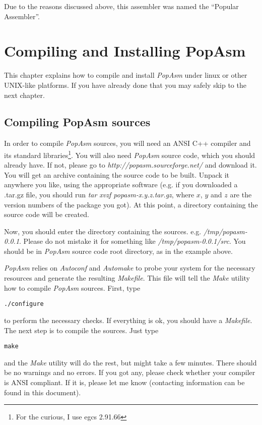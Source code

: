 \documentclass[a4paper,12pt]{book}
\begin{document}
Due to the reasons discussed above, this assembler was named the ``Popular Assembler''.

\chapter{Compiling and Installing PopAsm}
This chapter explains how to compile and install \emph{PopAsm} under linux or other UNIX-like
platforms. If you have already done that you may safely skip to the next chapter.

\section{Compiling PopAsm sources\label{COMPILING}}
In order to compile \emph{PopAsm} sources, you will need an ANSI C++ compiler and its standard
libraries\footnote{For the curious, I use egcs 2.91.66}. You will also need \emph{PopAsm} source
code, which you should already have. If not, please go to \emph{http://popasm.sourceforge.net/}
and download it. You will get an archive containing the source code to be built. Unpack it
anywhere you like, using the appropriate software (e.g. if you downloaded a .tar.gz file, you
should run \emph{tar xvzf popasm-x.y.z.tar.gz}, where $x$, $y$ and $z$ are the version numbers
of the package you got). At this point, a directory containing the source code will be created.

Now, you should enter the directory containing the sources. e.g. \emph{/tmp/popasm-0.0.1}. Please
do not mistake it for something like \emph{/tmp/popasm-0.0.1/src}. You should be in \emph{PopAsm}
source code root directory, as in the example above.

\emph{PopAsm} relies on \emph{Autoconf}\cite{AUTOCONF} and \emph{Automake}\cite{AUTOMAKE} to probe
your system for the necessary resources and generate the resulting \emph{Makefile}. This file will
tell the \emph{Make}\cite{MAKE} utility how to compile \emph{PopAsm} sources. First, type

\begin{verbatim}
./configure
\end{verbatim}

to perform the necessary checks. If everything is ok, you should have a \emph{Makefile}. The next
step is to compile the sources. Just type

\begin{verbatim}
make
\end{verbatim}

and the \emph{Make} utility will do the rest, but might take a few minutes. There should be no
warnings and no errors. If you got any, please check whether your compiler is ANSI compliant. If
it is, please let me know (contacting information can be found in this document).
\end{document}
